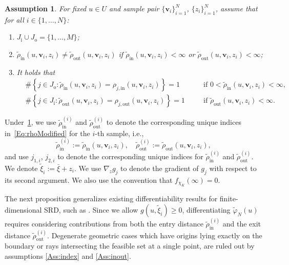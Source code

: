 \documentclass[%
onefignum,onetabnum]{siamonline250211}
\newtheorem{assumption}[theorem]{Assumption}
\begin{document}
\begin{assumption}\label{Ass:sample}
    For fixed $u\in U$ and sample pair $\{\boldsymbol{v}_i\}_{i=1}^N$, $\{z_i\}_{i=1}^N$, assume that for all $i\in\{1,\dots,N\}$:
    \begin{enumerate}[leftmargin=*]
        \item \label{Ass:index} $J_{\mathrm{i}}\cup J_{\mathrm{o}}=\{1,\dots,M\}$;
        \item \label{Ass:inout} $\tilde{\rho}_{\mathrm{in}}(u,\boldsymbol{v}_i,z_i) \neq \tilde{\rho}_{\mathrm{out}}(u,\boldsymbol{v}_i,z_i)$ if $\tilde{\rho}_{\mathrm{in}}(u,\boldsymbol{v}_i,z_i) < \infty$ or $\tilde{\rho}_{\mathrm{out}}(u,\boldsymbol{v}_i,z_i) < \infty$;
        \item \label{Ass:unique} It holds that
        \begin{align*}
            &\#\left\{ j\in J_{\mathrm{o}} : \tilde{\rho}_{\mathrm{in}}(u,\boldsymbol{v}_i,z_i)=\rho_{j,\mathrm{in}}(u,\boldsymbol{v}_i,z_i) \right\}=1 \quad &&\text{if $0<\tilde{\rho}_{\mathrm{in}}(u,\boldsymbol{v}_i,z_i)<\infty$,}\\
            &\#\left\{ j\in J_{\mathrm{i}} : \tilde{\rho}_{\mathrm{out}}(u,\boldsymbol{v}_i,z_i)=\rho_{j,\mathrm{out}}(u,\boldsymbol{v}_i,z_i) \right\}=1 \quad &&\text{if $\tilde{\rho}_{\mathrm{out}}(u,\boldsymbol{v}_i,z_i)<\infty$}.
        \end{align*}
    \end{enumerate}
\end{assumption}

Under~\cref{Ass:sample}, we use $\tilde{\rho}_{\mathrm{in}}^{(i)}$ and $\tilde{\rho}_{\mathrm{out}}^{(i)}$ to denote the corresponding unique indices in~\eqref{Eq:rhoModified} for the $i$-th sample, i.e.,
\begin{equation*}
    \tilde{\rho}_{\mathrm{in}}^{(i)}:=\tilde{\rho}_{\mathrm{in}}(u,\boldsymbol{v}_i,z_i),\quad \tilde{\rho}_{\mathrm{out}}^{(i)}:=\tilde{\rho}_{\mathrm{out}}(u,\boldsymbol{v}_i,z_i),
\end{equation*}
and use $j_{1,i}$, $j_{2,i}$ to denote the corresponding unique indices 
for $\tilde{\rho}_{\mathrm{in}}^{(i)}$ and $\tilde{\rho}_{\mathrm{out}}^{(i)}$. We denote $\tilde{\xi}_i := \bar{\xi} + z_i$. We use $\nabla_z g_j$ to denote the gradient of $g_j$ with respect to its second argument. We also use the convention that $f_{\chi_K}(\infty) = 0$.

The next proposition generalizes existing differentiability results for finite-dimensional SRD, such as \cite[Prop.~3.4]{HeStWe-SIAM25}. Since we allow $g(u,\tilde{\xi}_i) \geq 0$, differentiating $\tilde{\varphi}_N(u)$ requires considering contributions from both the entry distance $\tilde{\rho}_{\mathrm{in}}^{(i)}$ and the exit distance $\tilde{\rho}_{\mathrm{out}}^{(i)}$.
Degenerate geometric cases 
which have origins lying exactly on the boundary or rays intersecting the feasible set at a single point, are ruled out by assumptions \ref{Ass:index} and \ref{Ass:inout}.
\end{document}
